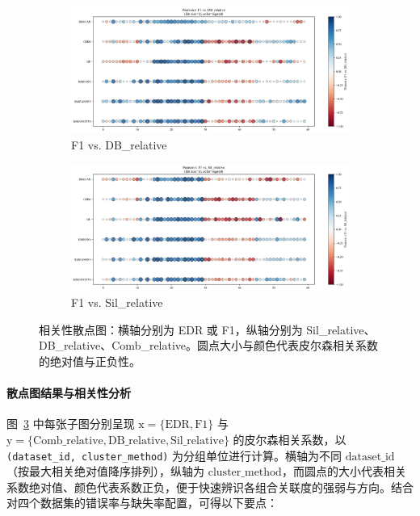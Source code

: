 \documentclass[10pt]{article} %
\numberwithin{equation}{section}
\begin{document}
\begin{enumerate}[label=(\alph*)]
\begin{figure}[htbp]
    \begin{subfigure}[b]{0.45\linewidth}
        \centering
        \includegraphics[width=\linewidth]{figures/point graph/dot_F1_vs_DB_relative_sorted.png}
        \caption{F1 vs. DB\_relative}
        \label{fig:dot_f1_db}
    \end{subfigure}
    \hfill
    \begin{subfigure}[b]{0.45\linewidth}
        \centering
        \includegraphics[width=\linewidth]{figures/point graph/dot_F1_vs_Sil_relative_sorted.png}
        \caption{F1 vs. Sil\_relative}
        \label{fig:dot_f1_sil}
    \end{subfigure}

    \caption{相关性散点图：横轴分别为 EDR 或 F1，纵轴分别为 Sil\_relative、DB\_relative、Comb\_relative。圆点大小与颜色代表皮尔森相关系数的绝对值与正负性。}
    \label{fig:correlation_scatter_six}
\end{figure}

\paragraph{散点图结果与相关性分析}
图~\ref{fig:correlation_scatter_six} 中每张子图分别呈现 \(\mathrm{x}=\{\text{EDR}, \text{F1}\}\) 与 \(\mathrm{y}=\{\text{Comb\_relative}, \text{DB\_relative}, \text{Sil\_relative}\}\) 的皮尔森相关系数，以 \texttt{(dataset\_id, cluster\_method)} 为分组单位进行计算。横轴为不同 \(\mathrm{dataset\_id}\)（按最大相关绝对值降序排列），纵轴为 \(\mathrm{cluster\_method}\)，而圆点的大小代表相关系数绝对值、颜色代表系数正负，便于快速辨识各组合关联度的强弱与方向。结合对四个数据集的错误率与缺失率配置，可得以下要点：


\end{enumerate}
\end{document}
